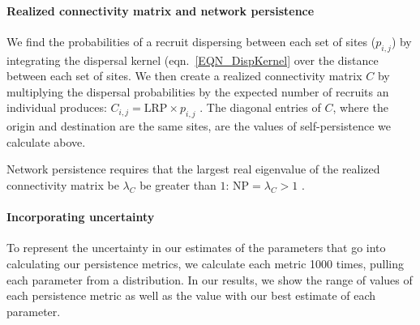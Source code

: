 \documentclass[12pt, oneside]{article}   	%
\begin{document}
\paragraph*{Realized connectivity matrix and network persistence}
We find the probabilities of a recruit dispersing between each set of sites ($p_{i,j}$) by integrating the dispersal kernel (eqn.\ \ref{EQN_DispKernel} over the distance between each set of sites. We then create a realized connectivity matrix $C$ by multiplying the dispersal probabilities by the expected number of recruits an individual produces: $C_{i,j} = \text{LRP} \times p_{i,j}$ \citep{burgess2014beyond}. The diagonal entries of $C$, where the origin and destination are the same sites, are the values of self-persistence we calculate above. 

Network persistence requires that the largest real eigenvalue of the realized connectivity matrix be $\lambda_C$ be greater than $1$: $\text{NP} = \lambda_C > 1$ \citep[e.g.][]{hastings_persistence_2006, white_population_2010, burgess2014beyond}.

\paragraph*{Incorporating uncertainty}
To represent the uncertainty in our estimates of the parameters that go into calculating our persistence metrics, we calculate each metric 1000 times, pulling each parameter from a distribution. In our results, we show the range of values of each persistence metric as well as the value with our best estimate of each parameter. 







\end{document}
